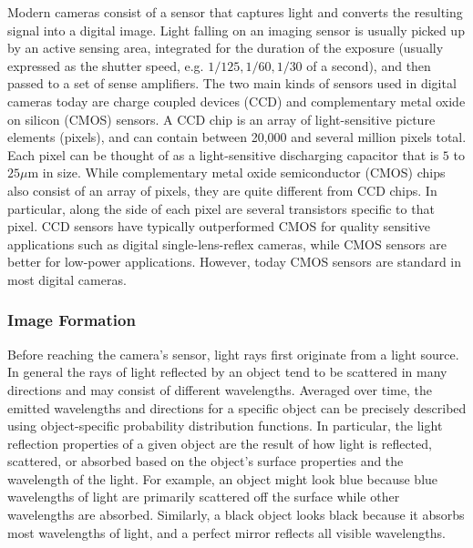 Modern cameras consist of a sensor that captures light and converts the resulting signal into a digital image. Light falling on an imaging sensor is usually picked up by an active sensing area, integrated for the duration of the exposure (usually expressed as the shutter speed, e.g. $1/125, 1/60, 1/30$ of a second), and then passed to a set of sense amplifiers. The two main kinds of sensors used in digital cameras today are charge coupled devices (CCD) and complementary metal oxide on silicon (CMOS) sensors.
A CCD chip is an array of light-sensitive picture elements (pixels), and can contain between 20,000 and several million pixels total. Each pixel can be thought of as a light-sensitive discharging capacitor that is $5$ to $25\mu \text{m}$ in size. While complementary metal oxide semiconductor (CMOS) chips also consist of an array of pixels, they are quite different from CCD chips. In particular, along the side of each pixel are several transistors specific to that pixel. CCD sensors have typically outperformed CMOS for quality sensitive applications such as digital single-lens-reflex cameras, while CMOS sensors are better for low-power applications. However, today CMOS sensors are standard in most digital cameras.

\subsubsection{Image Formation}
Before reaching the camera's sensor, light rays first originate from a light source. In general the rays of light reflected by an object tend to be scattered in many directions and may consist of different wavelengths. 
Averaged over time, the emitted wavelengths and directions for a specific object can be precisely described using object-specific probability distribution functions. In particular, the light reflection properties of a given object are the result of how light is reflected, scattered, or absorbed based on the object's surface properties and the wavelength of the light. For example, an object might look blue because blue wavelengths of light are primarily scattered off the surface while other wavelengths are absorbed. Similarly, a black object looks black because it absorbs most wavelengths of light, and a perfect mirror reflects all visible wavelengths.

